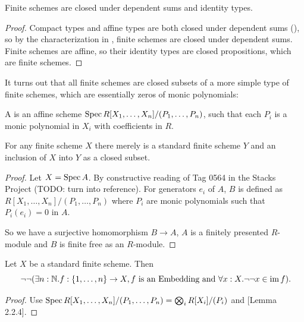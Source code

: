 \begin{lemma}
  Finite schemes are closed under dependent sums and identity types.
\end{lemma}

\begin{proof}
  Compact types and affine types are both closed under dependent sums (\cite[Lemma 2.0.3]{proper-draft}), so by the characterization in ,
  finite schemes are closed under dependent sums.
  Finite schemes are affine, so their identity types are closed propositions, which are finite schemes.
\end{proof}

It turns out that all finite schemes are closed subsets of a more simple type of finite schemes, which are essentially zeros of monic polynomials:

\begin{definition}
  A  is an affine scheme $\operatorname{Spec} R[X_1,\dots,X_n]/(P_1,\dots,P_n)$, such that each $P_i$ is a monic polynomial in $X_i$ with coefficients in $R$.
\end{definition}

\begin{lemma}
  For any finite scheme $X$ there merely is a standard finite scheme $Y$ and an inclusion of $X$ into $Y$ as a closed subset.
\end{lemma}

\begin{proof}
  Let $X=\operatorname{Spec} A$.
By constructive reading of Tag 0564 in the Stacks Project (TODO: turn into reference).
For generators $e_i$ of $A$, $B$ is defined as $R[X_1,\dots,X_n]/(P_1,\dots,P_n)$ where $P_i$ are monic polynomials such that $P_i(e_i)=0$ in $A$.

  So we have a surjective homomorphism $B\to A$, $A$ is a finitely presented $R$-module and $B$ is finite free as an $R$-module.
  
\end{proof}

\begin{lemma}
  \label{std-finite-scheme-not-not-finite-type}
  Let $X$ be a standard finite scheme. Then
  \[
    \neg\neg(\exists n:\N.f:\{1,\dots,n\}\to X, \text{$f$ is an Embedding and $\forall x:X.\neg\neg x\in\im f$})
    \rlap{.}
  \]
\end{lemma}

\begin{proof}
  Use $\operatorname{Spec} R[X_1,\dots,X_n]/(P_1,\dots,P_n)=\bigotimes_{i}R[X_i]/(P_i)$ and \cite{draft}[Lemma 2.2.4].
\end{proof}

